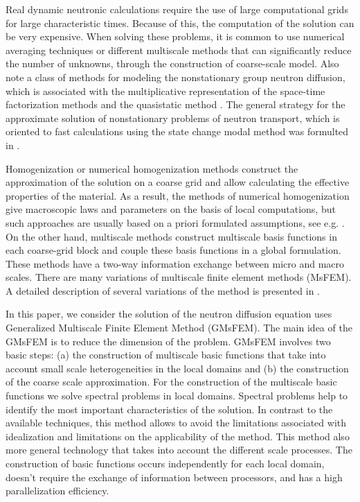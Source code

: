 \documentclass[runningheads]{llncs}
\begin{document}
Real dynamic neutronic calculations require the use of large computational grids for large characteristic times. 
Because of this, the computation of the solution can be very expensive.
When solving these problems, it is common to use numerical averaging techniques or different multiscale methods that can significantly reduce the number of unknowns, through the construction of coarse-scale model.
Also note a class of methods for modeling the nonstationary group neutron diffusion, which is associated with the multiplicative representation of the space-time factorization methods and the quasistatic method \cite{dulla2008quasi}. The general strategy for the approximate solution of nonstationary problems of neutron transport, which is oriented to fast calculations using the state change modal method was formulted in \cite{Progress18}.

Homogenization or numerical homogenization methods construct the approximation of the solution on a coarse grid and allow calculating the effective properties of the material.
As a result, the methods of numerical homogenization give macroscopic laws and parameters on the basis of local computations, but such approaches are usually based on a priori formulated assumptions, see e.g. \cite{Stalnov2017,Bakhvalov2012}. 
On the other hand, multiscale methods construct multiscale basis functions in each coarse-grid block and couple these basis functions in a global formulation. 
These methods have a two-way information exchange between micro and macro scales. 
There are many variations of multiscale finite element methods (MsFEM).
A detailed description of several variations of the method is presented in \cite{}.

In this paper, we consider the solution of the neutron diffusion equation uses Generalized Multiscale Finite Element Method (GMsFEM). 
The main idea of the GMsFEM is to reduce the dimension of the problem. 
GMsFEM  involves two basic steps: (a) the construction of multiscale basic functions that take into account small scale heterogeneities in the local domains and (b) the construction of the coarse scale approximation. 
For the construction of the multiscale basic functions we solve spectral problems in local domains.
Spectral problems help to identify the most important characteristics of the solution. 
In contrast to the available techniques, this method allows to avoid the limitations associated with idealization and limitations on the applicability of the method.
This method also more general technology that takes into account the different scale processes.
The construction of basic functions occurs independently for each local domain, doesn't require the exchange of information between processors, and  has a high parallelization efficiency.
\end{document}
